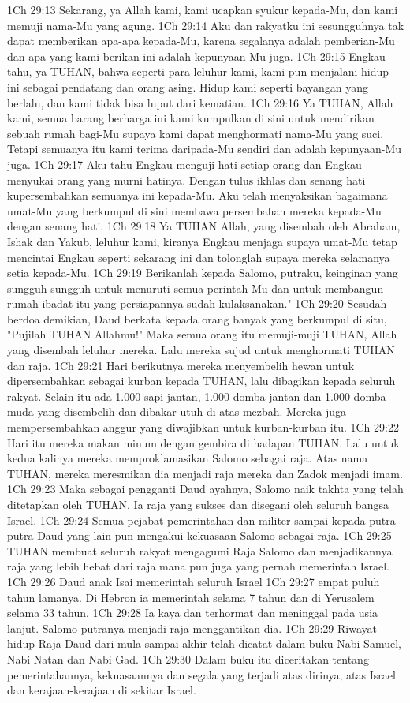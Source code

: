 1Ch 29:13  Sekarang, ya Allah kami, kami ucapkan syukur kepada-Mu, dan kami memuji nama-Mu yang agung.
1Ch 29:14  Aku dan rakyatku ini sesungguhnya tak dapat memberikan apa-apa kepada-Mu, karena segalanya adalah pemberian-Mu dan apa yang kami berikan ini adalah kepunyaan-Mu juga.
1Ch 29:15  Engkau tahu, ya TUHAN, bahwa seperti para leluhur kami, kami pun menjalani hidup ini sebagai pendatang dan orang asing. Hidup kami seperti bayangan yang berlalu, dan kami tidak bisa luput dari kematian.
1Ch 29:16  Ya TUHAN, Allah kami, semua barang berharga ini kami kumpulkan di sini untuk mendirikan sebuah rumah bagi-Mu supaya kami dapat menghormati nama-Mu yang suci. Tetapi semuanya itu kami terima daripada-Mu sendiri dan adalah kepunyaan-Mu juga.
1Ch 29:17  Aku tahu Engkau menguji hati setiap orang dan Engkau menyukai orang yang murni hatinya. Dengan tulus ikhlas dan senang hati kupersembahkan semuanya ini kepada-Mu. Aku telah menyaksikan bagaimana umat-Mu yang berkumpul di sini membawa persembahan mereka kepada-Mu dengan senang hati.
1Ch 29:18  Ya TUHAN Allah, yang disembah oleh Abraham, Ishak dan Yakub, leluhur kami, kiranya Engkau menjaga supaya umat-Mu tetap mencintai Engkau seperti sekarang ini dan tolonglah supaya mereka selamanya setia kepada-Mu.
1Ch 29:19  Berikanlah kepada Salomo, putraku, keinginan yang sungguh-sungguh untuk menuruti semua perintah-Mu dan untuk membangun rumah ibadat itu yang persiapannya sudah kulaksanakan."
1Ch 29:20  Sesudah berdoa demikian, Daud berkata kepada orang banyak yang berkumpul di situ, "Pujilah TUHAN Allahmu!" Maka semua orang itu memuji-muji TUHAN, Allah yang disembah leluhur mereka. Lalu mereka sujud untuk menghormati TUHAN dan raja.
1Ch 29:21  Hari berikutnya mereka menyembelih hewan untuk dipersembahkan sebagai kurban kepada TUHAN, lalu dibagikan kepada seluruh rakyat. Selain itu ada 1.000 sapi jantan, 1.000 domba jantan dan 1.000 domba muda yang disembelih dan dibakar utuh di atas mezbah. Mereka juga mempersembahkan anggur yang diwajibkan untuk kurban-kurban itu.
1Ch 29:22  Hari itu mereka makan minum dengan gembira di hadapan TUHAN. Lalu untuk kedua kalinya mereka memproklamasikan Salomo sebagai raja. Atas nama TUHAN, mereka meresmikan dia menjadi raja mereka dan Zadok menjadi imam.
1Ch 29:23  Maka sebagai pengganti Daud ayahnya, Salomo naik takhta yang telah ditetapkan oleh TUHAN. Ia raja yang sukses dan disegani oleh seluruh bangsa Israel.
1Ch 29:24  Semua pejabat pemerintahan dan militer sampai kepada putra-putra Daud yang lain pun mengakui kekuasaan Salomo sebagai raja.
1Ch 29:25  TUHAN membuat seluruh rakyat mengagumi Raja Salomo dan menjadikannya raja yang lebih hebat dari raja mana pun juga yang pernah memerintah Israel.
1Ch 29:26  Daud anak Isai memerintah seluruh Israel
1Ch 29:27  empat puluh tahun lamanya. Di Hebron ia memerintah selama 7 tahun dan di Yerusalem selama 33 tahun.
1Ch 29:28  Ia kaya dan terhormat dan meninggal pada usia lanjut. Salomo putranya menjadi raja menggantikan dia.
1Ch 29:29  Riwayat hidup Raja Daud dari mula sampai akhir telah dicatat dalam buku Nabi Samuel, Nabi Natan dan Nabi Gad.
1Ch 29:30  Dalam buku itu diceritakan tentang pemerintahannya, kekuasaannya dan segala yang terjadi atas dirinya, atas Israel dan kerajaan-kerajaan di sekitar Israel.


